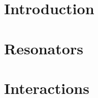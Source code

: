\def\mxx{\mu_{xx}} 
\def\mxd{\mu_{x\cdot}} 
\def\mxp{\mu_{x+}} 
\def\mxm{\mu_{x-}} 

\def\dTwoD{\delta_{\Delta}}

\def\Dxx{\mathbf{D}_{xx}}
\def\Dxxxx{\mathbf{D}_{xxxx}}


\def\sz{\sigma_{0}}
\def\so{\sigma_{1}}
\def\vrel{v_\text{rel}}
\def\Sbar{\bar{S}}
\def\Sm{S_{l-1/2}}
\def\Sp{S_{l+1/2}}

\def\szX[#1]{\sigma_{0{#1}}}
\def\soX[#1]{\sigma_{1{#1}}}

\def\fs{f_\text{s}}
\def\el{\epsilon_\text{l}}
\def\er{\epsilon_\text{r}}
\def\D{\mathcal{D}}
\def\L{\mathcal{L}}
\def\O{\mathcal{O}}
\def\S{\mathcal{S}}

\def\floor[#1]{\left\lfloor #1 \right\rfloor}
\def\ceil[#1]{\left\lceil #1 \right\rceil}
\def\ansatz{\ \overset{\mathcal{A}}{\Longrightarrow}\ }
\def\qaq{\quad \text{and} \quad}
\def\qwiq{\quad \text{with} \quad}
\def\qwhq{\quad \text{where} \quad}

\def\mystrut{\rule[-.2\baselineskip]{0pt}{\baselineskip}}

\def\th{\textsuperscript{th} }
\def\thOrder{\textsuperscript{th}-order }

\def\boldPhi{\boldsymbol{\phi}}
\def\eig{\text{eig}}
\mainmatter
\part{Introduction}\label{part:introduction}


\part{Resonators}\label{part:resonators}


% 

\part{Interactions}\label{part:interactions}


% 

